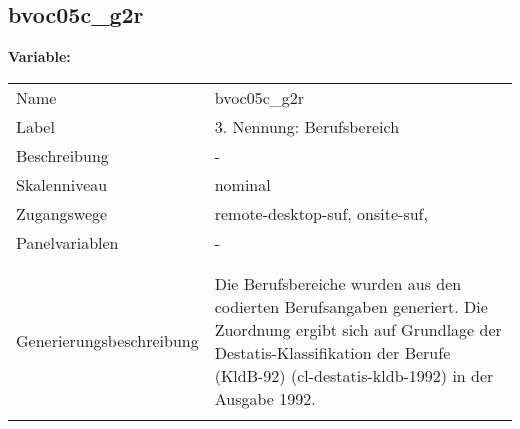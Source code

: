 	
	
	\subsection{bvoc05c\_g2r}
	\label{subSection:bvoc05c_g2r}

	\noindent\textbf{Variable:}\\
		\begin{tabular}{lL{11.3cm}}
			\label{tableVariable:bvoc05c_g2r}
			Name & bvoc05c\_g2r \\
			Label & 3. Nennung: Berufsbereich \\
			Beschreibung & - \\
			Skalenniveau & nominal \\
			Zugangswege &
				remote-desktop-suf,
				onsite-suf,
 \\
			Panelvariablen & -
			 \\
			 \\
 \\
					Generierungsbeschreibung & Die Berufsbereiche wurden aus den codierten Berufsangaben generiert. Die Zuordnung ergibt sich auf Grundlage der Destatis-Klassifikation der Berufe (KldB-92) (cl-destatis-kldb-1992) in der Ausgabe 1992. 
				 \\	
			 \\
		\end{tabular}






